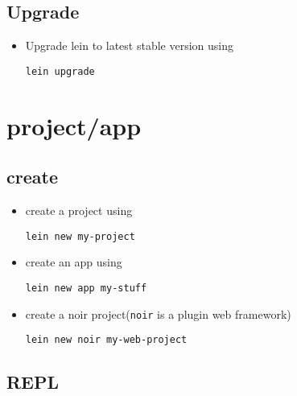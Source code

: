\documentclass[11pt]{article}
\begin{document}
\subsection{Upgrade}
\label{sec-1-2}

\begin{itemize}
\item Upgrade lein to latest stable version using

\begin{verbatim}
lein upgrade
\end{verbatim}
\end{itemize}
\section{project/app}
\label{sec-2}
\subsection{create}
\label{sec-2-1}

\begin{itemize}
\item create a project using

\begin{verbatim}
lein new my-project
\end{verbatim}
\item create an app using
      

\begin{verbatim}
lein new app my-stuff
\end{verbatim}
\item create a noir project(\texttt{noir} is a plugin web framework)

\begin{verbatim}
lein new noir my-web-project
\end{verbatim}
\end{itemize}
\subsection{REPL}
\label{sec-2-2}
\end{document}
